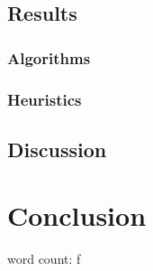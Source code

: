 \documentclass[british]{article}
\begin{document}
\subsection{Results}

\subsubsection{Algorithms}

\subsubsection{Heuristics}

\subsection{Discussion}


\section{Conclusion}
\label{conclusion}

 
 
 
word count: 
\printbibliography
f
\end{document}
